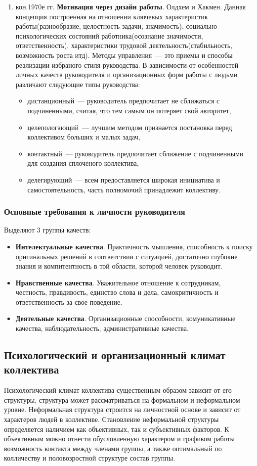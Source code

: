 \begin{enumerate}
	\item кон.1970е гг. \textbf{Мотивация через дизайн работы}. Олдхем и Хакмен. Данная концепция построенная на отношении ключевых характеристик работы(разнообразие, целостность задачи, значимость), социально-психологических состояний работника(осознание значимости, ответственность), характеристики трудовой деятельность(стабильность, возможность роста итд). Методы управления~--- это приемы и способы реализации избраного стиля руководства. В зависимости от особенностей личных качеств руководителя и организационных форм работы с людьми различают следующие типы руководства:
	\begin{itemize}
		\item дистанционный~--- руководитель предпочитает не сближаться с подчиненными, считая, что тем самым он потеряет свой авторитет,
		\item целепологающий~--- лучшим методом признается постановка перед коллективом больших и малых задач,
		\item контактный~--- руководитель предпочитает сближение с подчиненными для создания сплоченого коллектива,
		\item делегирующий~--- всем предоставляется широкая инициатива и самостоятельность, часть полномочий принадлежит коллективу.
	\end{itemize}
\end{enumerate}
\subsubsection{Основные требования к личности руководителя}
Выделяют 3 группы качеств:
\begin{itemize}
	\item \textbf{Интелектуальные качества}. Практичность мышления, способность к поиску оригинальных решений в соответствии с ситуацией, достаточно глубокие знания и компитентность в той области, которой человек руководит.
	\item \textbf{Нравственные качества}. Уважительное отношение к сотрудникам, честность, правдивость, единство слова и дела, самокритичность и ответственность за свое поведение.
	\item \textbf{Деятельные качества}. Организационные способности, комуникативные качества, наблюдательность, административные качества.
\end{itemize}

\subsection{Психологический и организационный климат коллектива}
Психологический климат коллектива существенным образом зависит от его структуры, структура может рассматриваться на формальном и неформальном уровне. Неформальная структура строится на личностной основе и зависит от характеров людей в коллективе. Становление неформальной структуры определяется наличием как объективных, так и субъективных факторов. К объективным можно отнести обусловленную характером и графиком работы возможность контакта между членами группы, а также оптимальный по колличеству и половозростной структуре состав группы.

